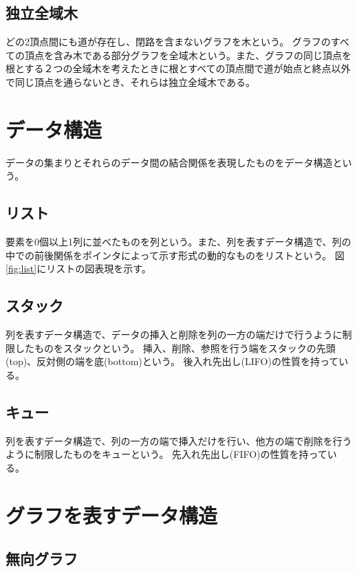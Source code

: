 \documentclass[dvipdfmx, twocolumn, 11pt]{jsarticle}
\begin{document}
    \subsection{独立全域木}
        どの2頂点間にも道が存在し、閉路を含まないグラフを木という。
        グラフのすべての頂点を含み木である部分グラフを全域木という。また、グラフの同じ頂点を根とする２つの全域木を考えたときに根とすべての頂点間で道が始点と終点以外で同じ頂点を通らないとき、それらは独立全域木である。



\section{データ構造}
    データの集まりとそれらのデータ間の結合関係を表現したものをデータ構造という。

    \subsection{リスト}
        要素を0個以上1列に並べたものを列という。また、列を表すデータ構造で、列の中での前後関係をポインタによって示す形式の動的なものをリストという。
        図\ref{fig:list}にリストの図表現を示す。

    
    \subsection{スタック}
        列を表すデータ構造で、データの挿入と削除を列の一方の端だけで行うように制限したものをスタックという。
        挿入、削除、参照を行う端をスタックの先頭(top)、反対側の端を底(bottom)という。
        後入れ先出し(LIFO)の性質を持っている。

    \subsection{キュー}
        列を表すデータ構造で、列の一方の端で挿入だけを行い、他方の端で削除を行うように制限したものをキューという。
        先入れ先出し(FIFO)の性質を持っている。


\section{グラフを表すデータ構造}
    \subsection{無向グラフ}
\end{document}
